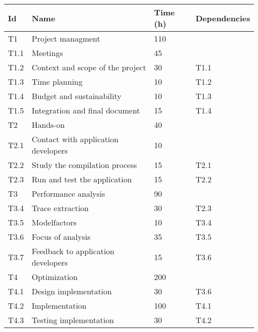 \begin{table}[htbp]
\begin{tabular}{llll}
Id   & Name                                             & Time (h) & Dependencies \\ \hline
T1   & Project managment                                & 110      &              \\ \hline
T1.1 & Meetings                                         & 45       &              \\
T1.2 & Context and scope of the project                 & 30       & T1.1         \\
T1.3 & Time planning                                    & 10       & T1.2         \\
T1.4 & Budget and sustainability                        & 10       & T1.3         \\
T1.5 & Integration and final document                   & 15       & T1.4         \\ \hline
T2   & Hands-on                                         & 40       &              \\ \hline
T2.1 & Contact with application developers              & 10       &              \\
T2.2 & Study the compilation process                    & 15       & T2.1         \\
T2.3 & Run and test the application                     & 15       & T2.2         \\ \hline
T3   & Performance analysis                             & 90       &              \\ \hline
T3.4 & Trace extraction                                 & 30       & T2.3         \\
T3.5 & Modelfactors                                     & 10       & T3.4         \\
T3.6 & Focus of analysis                                & 35       & T3.5         \\
T3.7 & Feedback to application developers               & 15       & T3.6         \\ \hline
T4   & Optimization                                     & 200      &              \\ \hline
T4.1 & Design implementation                            & 30       & T3.6         \\
T4.2 & Implementation                                   & 100      & T4.1         \\
T4.3 & Testing implementation                           & 30       & T4.2         \\ 

\end{tabular}
\end{table}
